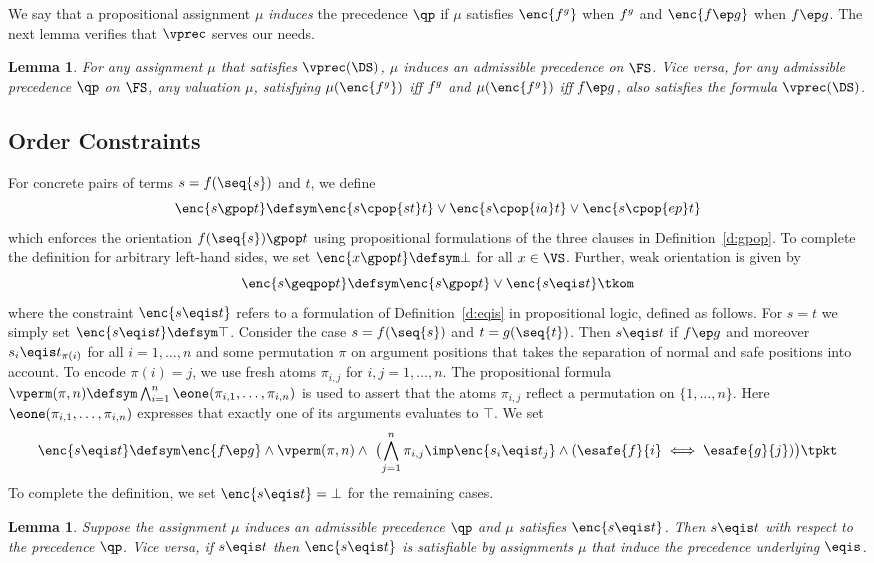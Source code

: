 \documentclass{LMCS}
\newtheorem{lemma}[thm]{Lemma}
\begin{document}
We say that a propositional assignment $\mu$ \emph{induces} the precedence
$\qp$ if $\mu$ satisfies $\enc{f \sp g}$ when $f \sp g$ and $\enc{f \ep g}$ when $f \ep g$. 
The next lemma verifies that $\vprec$ serves our needs.
\begin{lemma}
  For any assignment $\mu$ that satisfies $\vprec(\DS)$, 
  $\mu$ induces an admissible precedence on $\FS$.
Vice versa, for any admissible precedence $\qp$ on $\FS$, 
  any valuation $\mu$, satisfying $\mu(\enc{f \sp g})$ iff $f \sp g$ and 
  $\mu(\enc{f \sp g})$ iff $f \ep g$, also satisfies
  the formula $\vprec(\DS)$.
\end{lemma}

\subsection{Order Constraints}
For concrete pairs of terms $s = f(\seq{s})$ and $t$, we define
$$
\enc{s \gpop t} \defsym \enc{s \cpop{st} t} \vee \enc{s \cpop{ia} t} \vee \enc{s \cpop{ep} t}
$$
which enforces the orientation $f(\seq{s}) \gpop t$ using propositional formulations 
of the three clauses in Definition~\ref{d:gpop}. 
To complete the definition for arbitrary left-hand sides, we set $\enc{x \gpop t} \defsym \bot$ for all $x \in \VS$.
Further, weak orientation is given by
$$
\enc{s \geqpop t} \defsym \enc{s \gpop t} \vee \enc{s \eqis t} \tkom
$$
where the constraint $\enc{s \eqis t}$ refers to a formulation of 
Definition~\ref{d:eqis} in propositional logic, defined as follows.
For $s = t$ we simply set $\enc{s \eqis t} \defsym \top$. 
Consider the case $s = f(\seq{s})$ and $t = g(\seq{t})$. 
Then $s \eqis t$ if $f \ep g$ 
and moreover $s_i \eqis t_{\pi(i)}$ for all $i = 1,\dots,n$ and 
some permutation $\pi$ on argument positions that takes the separation of normal and safe positions into account.
To encode $\pi(i) = j$, we use fresh atoms $\pi_{i,j}$ for $i,j=1,\dots,n$. 
The propositional formula $\vperm(\pi,n) \defsym \bigwedge_{i=1}^{n} \eone(\pi_{i,1}, \dots, \pi_{i,n})$
is used to assert that the atoms $\pi_{i,j}$ reflect a permutation on $\{1,\dots,n\}$. 
Here $\eone(\pi_{i,1}, \dots, \pi_{i,n})$ expresses that exactly one of its arguments evaluates to $\top$.
We set
\begin{equation*}
  \enc{s \eqis t} \defsym 
    \enc{f \ep g} \wedge \vperm(\pi,n)
      \wedge~\bigl({\bigwedge_{j=1}^{n} \pi_{i,j} \imp \enc{s_i \eqis t_j} \wedge (\esafe{f}{i} \iff \esafe{g}{j})}\bigr) \tpkt
\end{equation*}
To complete the definition, we set $\enc{s \eqis t} = \bot$ for 
the remaining cases.
\begin{lemma}
  Suppose the assignment $\mu$ induces an admissible precedence $\qp$ and 
  $\mu$ satisfies $\enc{s \eqis t}$. 
  Then $s \eqis t$ with respect to the precedence $\qp$.
  Vice versa, if $s \eqis t$ then $\enc{s \eqis t}$ is satisfiable by assignments $\mu$ 
  that induce the precedence underlying $\eqis$.
\end{lemma}
\end{document}
